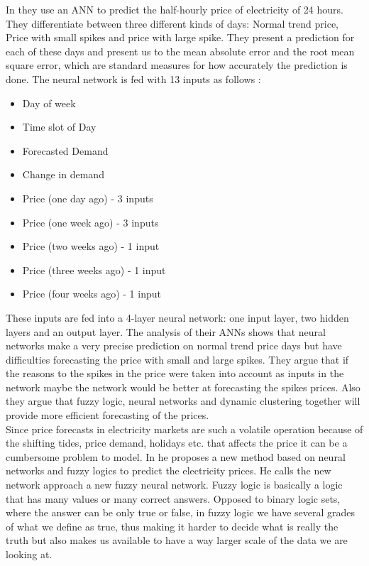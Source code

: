 In \cite{singhal2011electricity} they use an ANN to predict the half-hourly price of electricity of 24 hours. They differentiate between three different kinds of days: Normal trend price, Price with small spikes and price with large spike. They present a prediction for each of these days and present us to the mean absolute error and the root mean square error, which are standard measures for how accurately the prediction is done. The neural network is fed with 13 inputs as follows \cite{singhal2011electricity}:
\begin{itemize}[noitemsep,topsep=3pt,parsep=2pt,partopsep=3pt]
\item Day of week
\item Time slot of Day
\item Forecasted Demand
\item Change in demand
\item Price (one day ago) - 3 inputs 
\item Price (one week ago) - 3 inputs
\item Price (two weeks ago) - 1 input 
\item Price (three weeks ago) - 1 input 
\item Price (four weeks ago) - 1 input
\end{itemize}
These inputs are fed into a 4-layer neural network: one input layer, two hidden layers and an output layer. The analysis of their ANNs shows that neural networks make a very precise prediction on normal trend price days but have difficulties forecasting the price with small and large spikes. They argue that if the reasons to the spikes in the price were taken into account as inputs in the network maybe the network would be better at forecasting the spikes prices. Also they argue that fuzzy logic, neural networks and dynamic clustering together will provide more efficient forecasting of the prices.
\\[0.5cm]
Since price forecasts in electricity markets are such a volatile operation because of the shifting tides, price demand, holidays etc. that affects the price it can be a cumbersome problem to model. In \cite{amjady2006day} he proposes a new method based on neural networks and fuzzy logics to predict the electricity prices. He calls the new network approach a new fuzzy neural network. Fuzzy logic is basically a logic that has many values or many correct answers. Opposed to binary logic sets, where the answer can be only true or false, in fuzzy logic we have several grades of what we define as true, thus making it harder to decide what is really the truth but also makes us available to have a way larger scale of the data we are looking at.


